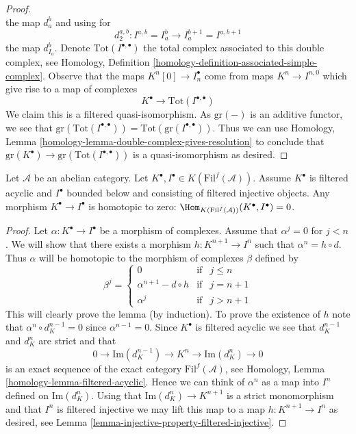 \begin{proof}
$$$$
the map $d_a^b$ and using for
$$
d_2^{a, b} : I^{a, b} = I_a^b \to I_a^{b + 1} = I^{a, b + 1}
$$
the map $d_{I_a}^b$. Denote $\text{Tot}(I^{\bullet, \bullet})$
the total complex associated to this double complex, see
Homology, Definition \ref{homology-definition-associated-simple-complex}.
Observe that the maps $K^n[0] \to I_n^\bullet$ come from maps
$K^n \to I^{n, 0}$ which give rise to a map of complexes
$$
K^\bullet \longrightarrow \text{Tot}(I^{\bullet, \bullet})
$$
We claim this is a filtered quasi-isomorphism.
As $\text{gr}(-)$ is an additive functor, we see that
$\text{gr}(\text{Tot}(I^{\bullet, \bullet})) =
\text{Tot}(\text{gr}(I^{\bullet, \bullet}))$.
Thus we can use
Homology,
Lemma \ref{homology-lemma-double-complex-gives-resolution}
to conclude that
$\text{gr}(K^\bullet) \to \text{gr}(\text{Tot}(I^{\bullet, \bullet}))$
is a quasi-isomorphism as desired.
\end{proof}

\begin{lemma}
\label{lemma-filtered-acyclic-is-zero}
Let $\mathcal{A}$ be an abelian category.
Let $K^\bullet, I^\bullet \in K(\text{Fil}^f(\mathcal{A}))$.
Assume $K^\bullet$ is filtered acyclic and
$I^\bullet$ bounded below and consisting of filtered injective objects.
Any morphism $K^\bullet \to I^\bullet$ is homotopic to zero:
$\Hom_{K(\text{Fil}^f(\mathcal{A}))}(K^\bullet, I^\bullet) = 0$.
\end{lemma}

\begin{proof}
Let $\alpha : K^\bullet \to I^\bullet$ be a morphism of
complexes. Assume that $\alpha^j = 0$ for $j < n$.
We will show that there exists a morphism $h : K^{n + 1} \to I^n$
such that $\alpha^n = h \circ d$. Thus $\alpha$ will be homotopic
to the morphism of complexes $\beta$ defined by
$$
\beta^j =
\left\{
\begin{matrix}
0 & \text{if} & j \leq n \\
\alpha^{n + 1} - d \circ h & \text{if} & j = n + 1 \\
\alpha^j & \text{if} & j > n + 1
\end{matrix}
\right.
$$
This will clearly prove the lemma (by induction).
To prove the existence of $h$ note that
$\alpha^n \circ d_K^{n - 1} = 0$ since
$\alpha^{n - 1} = 0$. Since $K^\bullet$ is filtered acyclic
we see that $d_K^{n - 1}$ and $d_K^n$ are strict and that
$$
0 \to \text{Im}(d_K^{n - 1}) \to K^n \to \text{Im}(d_K^n) \to 0
$$
is an exact sequence of the exact category $\text{Fil}^f(\mathcal{A})$, see
Homology, Lemma \ref{homology-lemma-filtered-acyclic}.
Hence we can think of $\alpha^n$ as a map into $I^n$ defined
on $\text{Im}(d_K^n)$.
Using that $\text{Im}(d_K^n) \to K^{n + 1}$ is a strict monomorphism
and that $I^n$ is filtered injective we may lift this map to a map
$h : K^{n + 1} \to I^n$ as desired, see
Lemma \ref{lemma-injective-property-filtered-injective}.
\end{proof}

